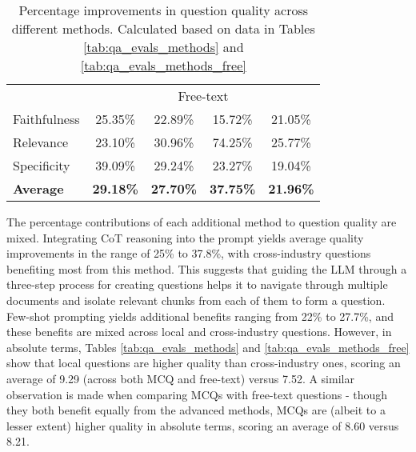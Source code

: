\begin{table}[H]
\begin{tabular}{lcccc}
\multicolumn{1}{c}{} & \multicolumn{4}{c}{Free-text}                                                                                                                                                                                                                  \\ \cline{2-5} 
Faithfulness         & 25.35\%                                                    & 22.89\%                                                   & 15.72\%                                                   & 21.05\%                                                   \\
Relevance            & 23.10\%                                                    & 30.96\%                                                   & 74.25\%                                                   & 25.77\%                                                   \\
Specificity          & 39.09\%                                                    & 29.24\%                                                   & 23.27\%                                                   & 19.04\%                                                   \\
\textbf{Average}     & \textbf{29.18\%}                                           & \textbf{27.70\%}                                          & \textbf{37.75\%}                                          & \textbf{21.96\%}                                          \\ \hline
\end{tabular}
\caption{Percentage improvements in question quality across different methods. Calculated based on data in Tables \ref{tab:qa_evals_methods} and \ref{tab:qa_evals_methods_free}}
\label{tab:qa_ablation}
\end{table}


The percentage contributions of each additional method to question quality are mixed. Integrating CoT reasoning into the prompt yields average quality improvements in the range of 25\% to 37.8\%, with cross-industry questions benefiting most from this method. This suggests that guiding the LLM through a three-step process for creating questions helps it to navigate through multiple documents and isolate relevant chunks from each of them to form a question. \\

Few-shot prompting yields additional benefits ranging from 22\% to 27.7\%, and these benefits are mixed across local and cross-industry questions. However, in absolute terms, Tables \ref{tab:qa_evals_methods} and \ref{tab:qa_evals_methods_free} show that local questions are higher quality than cross-industry ones, scoring an average of 9.29 (across both MCQ and free-text) versus 7.52. A similar observation is made when comparing MCQs with free-text questions - though they both benefit equally from the advanced methods, MCQs are (albeit to a lesser extent) higher quality in absolute terms, scoring an average of 8.60 versus 8.21. \\

